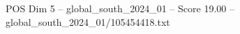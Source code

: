 \begin{textsample}{POS Dim 5 – global\_south\_2024\_01 – Score 19.00 – global\_south\_2024\_01/105454418.txt}
\end{textsample}
